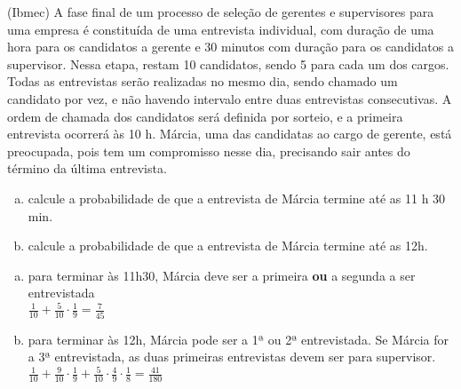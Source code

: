 \begin{ex}
 (Ibmec) A fase final de um processo de seleção de gerentes e supervisores para uma empresa é constituída de uma entrevista individual, com duração de uma hora para os candidatos a gerente e 30 minutos com duração para os candidatos a supervisor. 	
Nessa etapa, restam 10 candidatos, sendo 5 para cada um dos cargos. Todas as entrevistas serão realizadas no mesmo dia, sendo chamado um candidato por vez, e não havendo intervalo entre duas entrevistas consecutivas.
A ordem de chamada dos candidatos será definida por sorteio, e a primeira entrevista ocorrerá às 10 h. 
Márcia, uma das candidatas ao cargo de gerente, está preocupada, pois tem um compromisso nesse dia, precisando sair antes do término da última entrevista.
   \begin{enumerate}[(a)]
   \item calcule a probabilidade de que a entrevista de Márcia termine até as 11 h 30 min.
   \item calcule a probabilidade de que a entrevista de Márcia termine até as 12h. 
   \end{enumerate}
    \begin{sol}
     \phantom{A}
     \begin{enumerate} [(a)]
         \item para terminar às 11h30, Márcia deve ser a primeira \textbf{ou} a segunda a ser entrevistada \\
         $\frac{1}{10}+\frac{5}{10}\cdot\frac{1}{9}=\frac{7}{45}$
         \item para terminar às 12h, Márcia pode ser a 1ª ou 2ª entrevistada. Se Márcia for a 3ª entrevistada, as duas primeiras entrevistas devem ser para supervisor.\\
         $\frac{1}{10}+\frac{9}{10}\cdot\frac{1}{9}+\frac{5}{10}\cdot\frac{4}{9}\cdot\frac{1}{8}=\frac{41}{180}$
     \end{enumerate}
    \end{sol}
\end{ex}